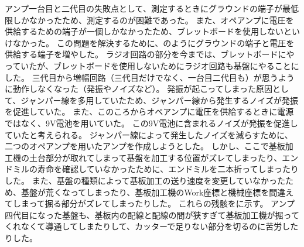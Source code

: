 \documentclass[report.tex]{subfiles}
\begin{document}
アンプ一台目と二代目の失敗点として、測定するときにグラウンドの端子が最低限しかなかったため、測定するのが困難であった。
また、オペアンプに電圧を供給するための端子が一個しかなかったため、ブレットボードを使用しないといけなかった。
この問題を解決するために、のようにグラウンドの端子と電圧を供給する端子を増やした。
ラジオ回路の部分を今までは、ブレットボードにやっていたが、ブレットボードを使用しないためにラジオ回路も基盤にやることにした。
三代目から増幅回路（三代目だけでなく、一台目二代目も）が思うように動作しなくなった（発振やノイズなど）。
発振が起こってしまった原因として、ジャンパー線を多用していたため、ジャンパー線から発生するノイズが発振を促進していた。
また、このころからオペアンプに電圧を供給するときに電源ではなく、9V電池を用いていた。
この9V電池に含まれるノイズが発振を促進していたと考えられる。
ジャンパー線によって発生したノイズを減らすために、二つのオペアンプを用いたアンプを作成しようとした。
しかし、ここで基板加工機の土台部分が取れてしまって基盤を加工する位置がズレてしまったり、エンドミルの寿命を確認していなかったために、エンドミルを二本折ってしまったりした。
また、基盤の種類によって基板加工の送り速度を変更していなかったため、基盤が荒くなってしまったり、基板加工機のWork座標と機械座標を間違えてしまって掘る部分がズレてしまったりした。
これらの残骸をに示す。
アンプ四代目になった基盤も、基板内の配線と配線の間が狭すぎて基板加工機が掘ってくれなくて導通してしまたりして、カッターで足りない部分を切るのに苦労したりした。
\end{document}
